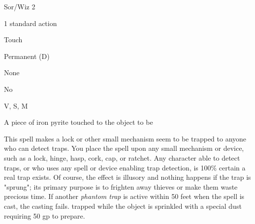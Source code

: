 
\begin{description*}
\item[Level:] Sor/Wiz 2
\item[Casting Time:] 1 standard action
\item[Range:] Touch
\item[Duration:] Permanent (D)
\item[Saving Throw:] None
\item[Spell Resistance:] No
\item[Components:] V, S, M
\item[Arcane Material Component:] A piece of iron pyrite touched to the object to be
\end{description*}

This spell makes a lock or other small mechanism seem to be trapped to anyone who
can detect traps. You place the spell upon any small mechanism or device, such
as a lock, hinge, hasp, cork, cap, or ratchet. Any character able to detect traps,
or who uses any spell or device enabling trap detection, is 100\% certain a real
trap exists. Of course, the effect is illusory and nothing happens if the trap
is "sprung"; its primary purpose is to frighten away thieves or make them waste
precious time.
If another \textit{phantom trap} is active within 50 feet when the spell is cast,
the casting fails.
trapped while the object is sprinkled with a special dust requiring 50 gp to prepare.